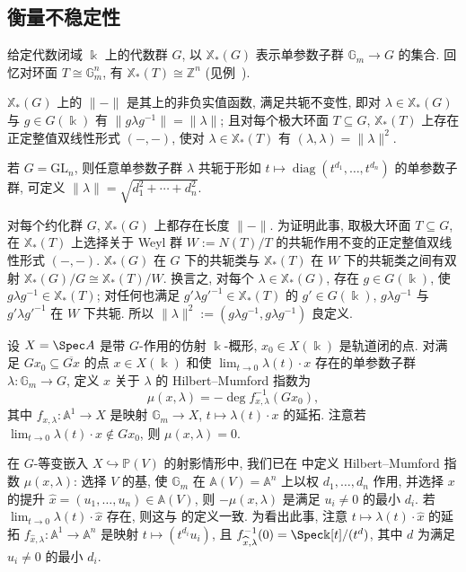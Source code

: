 \subsection{衡量不稳定性}\label{src:8.6.1-subsection}
给定代数闭域 $\Bbbk$ 上的代数群 $G$, 以 $\mathbb X_*(G)$ 表示单参数子群 $\mathbb G_m\to G$ 的集合. 回忆对环面 $T\cong\mathbb G_m^n$, 有 $\mathbb X_*(T)\cong\mathbb Z^n$ (见例~).
\begin{definition}\label{src:8.6.1}
$\mathbb X_*(G)$ 上的 $\|-\|$ 是其上的非负实值函数, 满足共轭不变性, 即对 $\lambda\in\mathbb X_*(G)$ 与 $g\in G(\Bbbk)$ 有 $\|g\lambda g^{-1}\|=\|\lambda\|$; 且对每个极大环面 $T\subseteq G$, $\mathbb X_*(T)$ 上存在正定整值双线性形式 $(-,-)$, 使对 $\lambda\in\mathbb X_*(T)$ 有 $(\lambda,\lambda)=\|\lambda\|^2$.
\end{definition}
\begin{example}\label{src:8.6.2}
若 $G=\mathrm{GL}_n$, 则任意单参数子群 $\lambda$ 共轭于形如 $t\mapsto\operatorname{diag}(t^{d_1},\ldots,t^{d_n})$ 的单参数子群, 可定义 $\|\lambda\|=\sqrt{d_1^2+\cdots+d_n^2}$.
\end{example}
\begin{example}\label{src:8.6.3}
对每个约化群 $G$, $\mathbb X_*(G)$ 上都存在长度 $\|-\|$. 为证明此事, 取极大环面 $T\subseteq G$, 在 $\mathbb X_*(T)$ 上选择关于 Weyl 群 $W:=N(T)/T$ 的共轭作用不变的正定整值双线性形式 $(-,-)$. $\mathbb X_*(G)$ 在 $G$ 下的共轭类与 $\mathbb X_*(T)$ 在 $W$ 下的共轭类之间有双射 $\mathbb X_*(G)/G\cong\mathbb X_*(T)/W$. 换言之, 对每个 $\lambda\in\mathbb X_*(G)$, 存在 $g\in G(\Bbbk)$, 使 $g\lambda g^{-1}\in\mathbb X_*(T)$; 对任何也满足 $g'\lambda g'^{-1}\in\mathbb X_*(T)$ 的 $g'\in G(\Bbbk)$, $g\lambda g^{-1}$ 与 $g'\lambda g'^{-1}$ 在 $W$ 下共轭. 所以 $\|\lambda\|^2:=(g\lambda g^{-1},g\lambda g^{-1})$ 良定义.
\end{example}
设 $X=\Spec A$ 是带 $G$-作用的仿射 $\Bbbk$-概形, $x_0\in X(\Bbbk)$ 是轨道闭的点. 对满足 $Gx_0\subseteq\overline{Gx}$ 的点 $x\in X(\Bbbk)$ 和使 $\lim_{t\to0}\lambda(t)\cdot x$ 存在的单参数子群 $\lambda:\mathbb G_m\to G$, 定义 $x$ 关于 $\lambda$ 的 Hilbert--Mumford 指数为
\begin{equation}\label{src:8.6.4}
\mu(x,\lambda)=-\deg f_{x,\lambda}^{-1}(Gx_0),
\end{equation}
其中 $f_{x,\lambda}:\mathbb A^1\to X$ 是映射 $\mathbb G_m\to X$, $t\mapsto\lambda(t)\cdot x$ 的延拓. 注意若 $\lim_{t\to0}\lambda(t)\cdot x\notin Gx_0$, 则 $\mu(x,\lambda)=0$.

在 $G$-等变嵌入 $X\hookrightarrow\mathbb P(V)$ 的射影情形中, 我们已在  中定义 Hilbert--Mumford 指数 $\mu(x,\lambda)$: 选择 $V$ 的基, 使 $\mathbb G_m$ 在 $\mathbb A(V)=\mathbb A^n$ 上以权 $d_1,\ldots,d_n$ 作用, 并选择 $x$ 的提升 $\widehat x=(u_1,\ldots,u_n)\in\mathbb A(V)$, 则 $-\mu(x,\lambda)$ 是满足 $u_i\ne0$ 的最小 $d_i$. 若 $\lim_{t\to0}\lambda(t)\cdot\widehat x$ 存在, 则这与  的定义一致. 为看出此事, 注意 $t\mapsto\lambda(t)\cdot\widehat x$ 的延拓 $f_{\widehat x,\lambda}:\mathbb A^1\to\mathbb A^n$ 是映射 $t\mapsto(t^{d_i}u_i)$, 且 $f_{\widehat x,\lambda}^{-1}(0)=\Spec\Bbbk[t]/(t^d)$, 其中 $d$ 为满足 $u_i\ne0$ 的最小 $d_i$.


